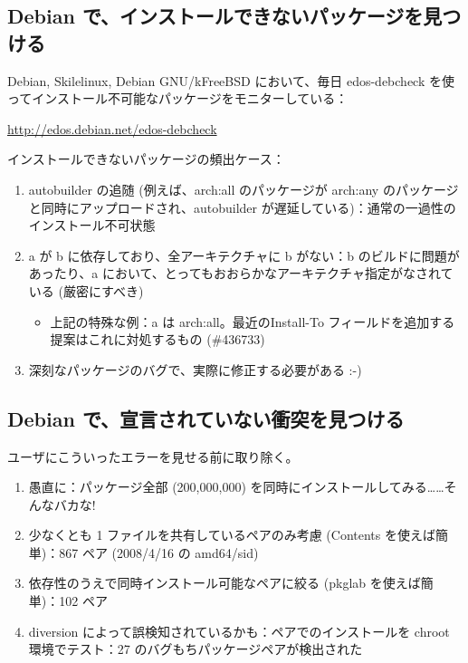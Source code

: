 \documentclass[mingoth,a4paper]{jsarticle}
\begin{document}
\subsection{Debian で、インストールできないパッケージを見つける}

Debian, Skilelinux, Debian GNU/kFreeBSD において、毎日 edos-debcheck を使ってインストール不可能なパッケージをモニターしている：

\url{http://edos.debian.net/edos-debcheck}

インストールできないパッケージの頻出ケース：

\begin{enumerate}
\item autobuilder の追随 (例えば、arch:all のパッケージが arch:any のパッケージと同時にアップロードされ、autobuilder が遅延している)：通常の一過性のインストール不可状態
\item a が b に依存しており、全アーキテクチャに b がない：b のビルドに問題があったり、a において、とってもおおらかなアーキテクチャ指定がなされている (厳密にすべき)

\begin{itemize}
\item 上記の特殊な例：a は arch:all。最近のInstall-To フィールドを追加する提案はこれに対処するもの (\#436733)
\end{itemize}
\item 深刻なパッケージのバグで、実際に修正する必要がある :-)
\end{enumerate}


\subsection{Debian で、宣言されていない衝突を見つける}

ユーザにこういったエラーを見せる前に取り除く。

\begin{enumerate}
\item 愚直に：パッケージ全部 (200,000,000) を同時にインストールしてみる……そんなバカな!
\item 少なくとも 1 ファイルを共有しているペアのみ考慮 (Contents を使えば簡単)：867 ペア (2008/4/16 の amd64/sid)
\item 依存性のうえで同時インストール可能なペアに絞る (pkglab を使えば簡単)：102 ペア
\item diversion によって誤検知されているかも：ペアでのインストールを chroot 環境でテスト：27 のバグもちパッケージペアが検出された
\end{enumerate}
\end{document}
